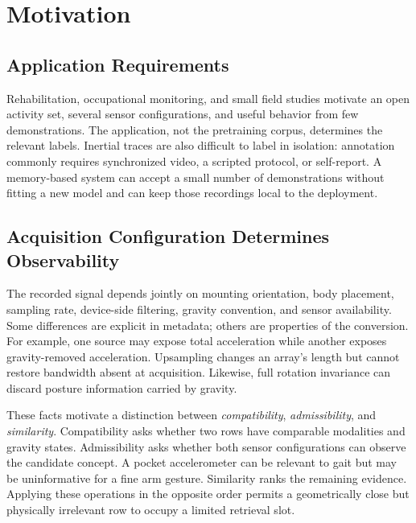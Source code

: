 \section{Motivation}
\label{sec:motivation}

\subsection{Application Requirements}
\label{sec:why}

Rehabilitation, occupational monitoring, and small field studies motivate an open activity set,
several sensor configurations, and useful behavior from few demonstrations. The application, not
the pretraining corpus, determines the relevant labels. Inertial traces are also difficult to label
in isolation: annotation commonly requires synchronized video, a scripted protocol, or self-report.
A memory-based system can accept a small number of demonstrations without fitting a new model and
can keep those recordings local to the deployment.

\subsection{Acquisition Configuration Determines Observability}
\label{sec:no_grammar}
\label{sec:heterogeneity_motiv}

The recorded signal depends jointly on mounting orientation, body placement, sampling rate,
device-side filtering, gravity convention, and sensor availability. Some differences are explicit
in metadata; others are properties of the conversion. For example, one source may expose total
acceleration while another exposes gravity-removed acceleration. Upsampling changes an array's
length but cannot restore bandwidth absent at acquisition. Likewise, full rotation invariance can
discard posture information carried by gravity.

These facts motivate a distinction between \emph{compatibility}, \emph{admissibility}, and
\emph{similarity}. Compatibility asks whether two rows have comparable modalities and gravity
states. Admissibility asks whether both sensor configurations can observe the candidate concept. A
pocket accelerometer can be relevant to gait but may be uninformative for a fine arm gesture.
Similarity ranks the remaining evidence. Applying these operations in the opposite order permits a
geometrically close but physically irrelevant row to occupy a limited retrieval slot.

